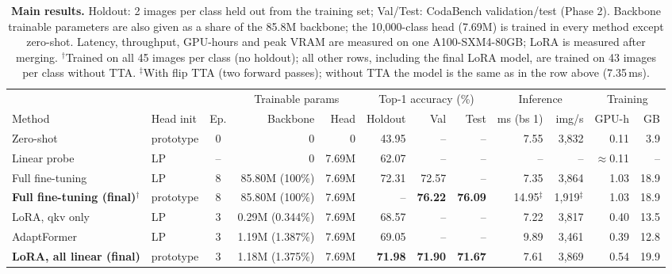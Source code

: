 \begin{table}[t]
  \centering
  \footnotesize
  \setlength{\tabcolsep}{4pt}
  \begin{tabular}{@{}llcrrrrrrrrr@{}}
    \toprule
    & & & \multicolumn{2}{c}{Trainable params} & \multicolumn{3}{c}{Top-1 accuracy (\%)} & \multicolumn{2}{c}{Inference} & \multicolumn{2}{c}{Training} \\
    \cmidrule(lr){4-5} \cmidrule(lr){6-8} \cmidrule(lr){9-10} \cmidrule(l){11-12}
    Method & Head init & Ep. & Backbone & Head & Holdout & Val & Test & ms (bs 1) & img/s & GPU-h & GB \\
    \midrule
    Zero-shot & prototype & 0 & 0 & 0 & 43.95 & -- & -- & 7.55 & 3,832 & 0.11 & 3.9 \\
    Linear probe & LP & -- & 0 & 7.69M & 62.07 & -- & -- & -- & -- & $\approx$0.11 & -- \\
    \midrule
    Full fine-tuning & LP & 8 & 85.80M (100\%) & 7.69M & 72.31 & 72.57 & -- & 7.35 & 3,864 & 1.03 & 18.9 \\
    \textbf{Full fine-tuning (final)}$^\dagger$ & prototype & 8 & 85.80M (100\%) & 7.69M & -- & \textbf{76.22} & \textbf{76.09} & 14.95$^\ddagger$ & 1,919$^\ddagger$ & 1.03 & 18.9 \\
    \midrule
    LoRA, qkv only & LP & 3 & 0.29M (0.344\%) & 7.69M & 68.57 & -- & -- & 7.22 & 3,817 & 0.40 & 13.5 \\
    AdaptFormer & LP & 3 & 1.19M (1.387\%) & 7.69M & 69.05 & -- & -- & 9.89 & 3,461 & 0.39 & 12.8 \\
    \textbf{LoRA, all linear (final)} & prototype & 3 & 1.18M (1.375\%) & 7.69M & \textbf{71.98} & \textbf{71.90} & \textbf{71.67} & 7.61 & 3,869 & 0.54 & 19.9 \\
    \bottomrule
  \end{tabular}
  \caption{\textbf{Main results.}
  Holdout: 2 images per class held out from the training set; Val/Test: CodaBench validation/test (Phase 2).
  Backbone trainable parameters are also given as a share of the 85.8M backbone; the 10,000-class head (7.69M) is trained in every method except zero-shot.
  Latency, throughput, GPU-hours and peak VRAM are measured on one A100-SXM4-80GB; LoRA is measured after merging.
  $^\dagger$Trained on all 45 images per class (no holdout); all other rows, including the final LoRA model, are trained on 43 images per class without TTA. $^\ddagger$With flip TTA (two forward passes); without TTA the model is the same as in the row above (7.35\,ms).}
  \label{tab:main}
\end{table}

